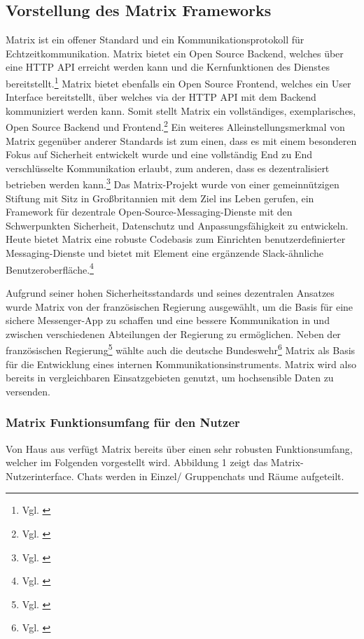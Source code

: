 \subsection{Vorstellung des Matrix Frameworks}\label{chapter:vdmf}
Matrix ist ein offener Standard und ein Kommunikationsprotokoll für  Echtzeitkommunikation. Matrix bietet ein Open Source Backend, welches über eine HTTP API erreicht werden kann und die Kernfunktionen des Dienstes bereitstellt.\footnote{Vgl. \cite{Matrix.org2020}} Matrix bietet ebenfalls ein Open Source Frontend, welches ein User Interface bereitstellt, über welches via der HTTP API mit dem Backend kommuniziert werden kann. Somit stellt Matrix ein vollständiges, exemplarisches, Open Source Backend und Frontend.\footnote{Vgl. \cite{Github2020}} 
Ein weiteres Alleinstellungsmerkmal von Matrix gegenüber anderer Standards ist zum einen, dass es mit einem besonderen Fokus auf Sicherheit entwickelt wurde und eine vollständig End zu End verschlüsselte Kommunikation  erlaubt, zum anderen, dass es dezentralisiert betrieben werden kann.\footnote{Vgl. \cite[S. 1 ff.]{Nccgroup2016}}
Das Matrix-Projekt wurde von einer gemeinnützigen Stiftung mit Sitz in Großbritannien mit dem Ziel ins Leben gerufen, ein Framework für dezentrale Open-Source-Messaging-Dienste mit den Schwerpunkten Sicherheit, Datenschutz und Anpassungsfähigkeit zu entwickeln. Heute bietet Matrix eine robuste Codebasis zum Einrichten benutzerdefinierter Messaging-Dienste und bietet mit Element eine ergänzende Slack-ähnliche Benutzeroberfläche.\footnote{Vgl. \cite{Matrix.org2020}}

Aufgrund seiner hohen Sicherheitsstandards und seines dezentralen Ansatzes wurde Matrix  von der französischen Regierung ausgewählt, um die Basis für eine sichere Messenger-App zu schaffen und eine bessere Kommunikation in und zwischen verschiedenen Abteilungen der Regierung zu ermöglichen. Neben der französischen Regierung\footnote{Vgl. \cite{Republique-Francaise2018}} wählte auch die deutsche Bundeswehr\footnote{Vgl. \cite{Weiss2020}} Matrix als Basis für die Entwicklung eines internen Kommunikationsinstruments. Matrix wird also bereits in vergleichbaren Einsatzgebieten genutzt, um hochsensible Daten zu versenden.

\subsubsection{Matrix Funktionsumfang für den Nutzer}\label{chapter:aemn}
Von Haus aus verfügt Matrix bereits über einen sehr robusten Funktionsumfang, welcher im Folgenden vorgestellt wird.
Abbildung 1 zeigt das Matrix-Nutzerinterface. Chats werden in Einzel/ Gruppenchats und Räume aufgeteilt.

